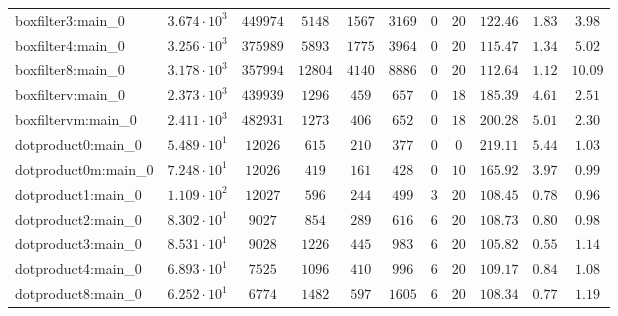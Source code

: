\begin{tabular}{|l|c|c|c|c|c|c|c|c|c|c|}
boxfilter3:main\_0             & $ 3.674 \cdot 10^{3} $ & $ 449974   $ & $ 5148   $ & $ 1567   $ & $ 3169   $ & $ 0    $ & $ 20   $ & $ 122.46      $ & $ 1.83    $ & $ 3.98    $ \\
boxfilter4:main\_0             & $ 3.256 \cdot 10^{3} $ & $ 375989   $ & $ 5893   $ & $ 1775   $ & $ 3964   $ & $ 0    $ & $ 20   $ & $ 115.47      $ & $ 1.34    $ & $ 5.02    $ \\
boxfilter8:main\_0             & $ 3.178 \cdot 10^{3} $ & $ 357994   $ & $ 12804  $ & $ 4140   $ & $ 8886   $ & $ 0    $ & $ 20   $ & $ 112.64      $ & $ 1.12    $ & $ 10.09   $ \\
boxfilterv:main\_0             & $ 2.373 \cdot 10^{3} $ & $ 439939   $ & $ 1296   $ & $ 459    $ & $ 657    $ & $ 0    $ & $ 18   $ & $ 185.39      $ & $ 4.61    $ & $ 2.51    $ \\
boxfiltervm:main\_0            & $ 2.411 \cdot 10^{3} $ & $ 482931   $ & $ 1273   $ & $ 406    $ & $ 652    $ & $ 0    $ & $ 18   $ & $ 200.28      $ & $ 5.01    $ & $ 2.30    $ \\
dotproduct0:main\_0            & $ 5.489 \cdot 10^{1} $ & $ 12026    $ & $ 615    $ & $ 210    $ & $ 377    $ & $ 0    $ & $ 0    $ & $ 219.11      $ & $ 5.44    $ & $ 1.03    $ \\
dotproduct0m:main\_0           & $ 7.248 \cdot 10^{1} $ & $ 12026    $ & $ 419    $ & $ 161    $ & $ 428    $ & $ 0    $ & $ 10   $ & $ 165.92      $ & $ 3.97    $ & $ 0.99    $ \\
dotproduct1:main\_0            & $ 1.109 \cdot 10^{2} $ & $ 12027    $ & $ 596    $ & $ 244    $ & $ 499    $ & $ 3    $ & $ 20   $ & $ 108.45      $ & $ 0.78    $ & $ 0.96    $ \\
dotproduct2:main\_0            & $ 8.302 \cdot 10^{1} $ & $ 9027     $ & $ 854    $ & $ 289    $ & $ 616    $ & $ 6    $ & $ 20   $ & $ 108.73      $ & $ 0.80    $ & $ 0.98    $ \\
dotproduct3:main\_0            & $ 8.531 \cdot 10^{1} $ & $ 9028     $ & $ 1226   $ & $ 445    $ & $ 983    $ & $ 6    $ & $ 20   $ & $ 105.82      $ & $ 0.55    $ & $ 1.14    $ \\
dotproduct4:main\_0            & $ 6.893 \cdot 10^{1} $ & $ 7525     $ & $ 1096   $ & $ 410    $ & $ 996    $ & $ 6    $ & $ 20   $ & $ 109.17      $ & $ 0.84    $ & $ 1.08    $ \\
dotproduct8:main\_0            & $ 6.252 \cdot 10^{1} $ & $ 6774     $ & $ 1482   $ & $ 597    $ & $ 1605   $ & $ 6    $ & $ 20   $ & $ 108.34      $ & $ 0.77    $ & $ 1.19    $ \\

\end{tabular}
